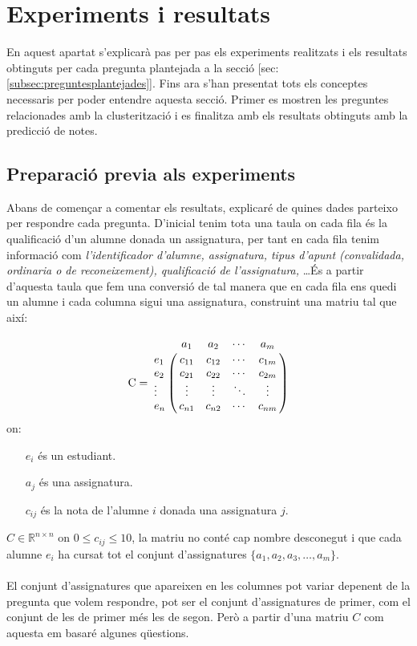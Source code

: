 \documentclass[12pt,a4paper,catalan]{article}
\begin{document}

\newpage

\section{Experiments i resultats}
\label{sec:experimentsiresultats}
En aquest apartat s'explicarà pas per pas els experiments realitzats i els resultats obtinguts per cada pregunta plantejada a la secció [sec:\ref{subsec:preguntesplantejades}]. Fins ara s'han presentat tots els conceptes necessaris per poder entendre aquesta secció. Primer es mostren les preguntes relacionades amb la clusterització i es finalitza amb els resultats obtinguts amb la predicció de notes.

\subsection{Preparació previa als experiments}
Abans de començar a comentar els resultats, explicaré de quines dades parteixo per respondre cada pregunta. D'inicial tenim tota una taula on cada fila és la qualificació d'un alumne donada un assignatura, per tant en cada fila tenim informació com \textit{l'identificador d'alumne, assignatura, tipus d'apunt (convalidada, ordinaria o de reconeixement), qualificació de l'assignatura,} \ldots És a partir d'aquesta taula que fem una conversió de tal manera que en cada fila ens quedi un alumne i cada columna sigui una assignatura, construint una matriu tal que així:

$$
\mathrm{C} = \bordermatrix{ &         a_1   &    a_2   &   \cdots    &    a_m  \cr
                  e_1    &  c_{11}  &  c_{12}  &   \cdots    &  c_{1m} \cr
                  e_2    &  c_{21}  &  c_{22}  &   \cdots    &  c_{2m}    \cr
                  \vdots &  \vdots  &  \vdots  &   \ddots    &  \vdots \cr
                  e_n    &  c_{n1}  &  c_{n2}  &   \cdots    &  c_{nm} \cr
                  }
$$
on:
\begin{itemize}[leftmargin=.5in]
	\item [$e_i$] és un estudiant.
	\item [$a_j$] és una assignatura.
	\item [$c_{ij}$] és la nota de l'alumne $i$ donada una assignatura $j$.
\end{itemize}

$C\in \mathbb{R}^{n \times n}$ on $0 \leq c_{ij} \leq 10$, la matriu no conté cap nombre desconegut i que cada alumne $e_i$ ha cursat tot el conjunt d'assignatures $\{a_1, a_2, a_3, \ldots, a_m\}$.
\\
\\
El conjunt d'assignatures que apareixen en les columnes pot variar depenent de la pregunta que volem respondre, pot ser el conjunt d'assignatures de primer, com el conjunt de les de primer més les de segon. Però a partir d'una matriu $C$ com aquesta em basaré algunes qüestions.
\end{document}
